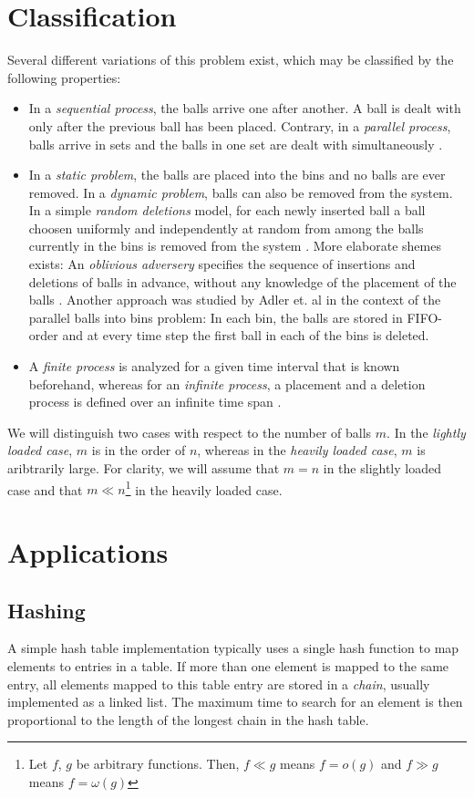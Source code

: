 \documentclass{acm_proc_article-sp}
\begin{document}
\section{Classification}
\label{sec:classification}
Several different variations of this problem exist, which may be classified by the following properties:
\begin{itemize}
\item In a \emph{sequential process}, the balls arrive one after another. A  ball is dealt with only after the previous ball has been placed. Contrary, in a \emph{parallel process}, balls arrive in sets and the balls in one set are dealt with simultaneously \cite{ABS98}. 
\item In a \emph{static problem}, the balls are placed into the bins and no balls are ever removed. In a \emph{dynamic problem}, balls can also be removed from the system. In a simple \emph{random deletions} model, for each newly inserted ball a ball choosen uniformly and independently at random from among the balls currently in the bins is removed from the system \cite{ABKU99} \cite{MRS01}. More elaborate shemes exists: An \emph{oblivious adversery} specifies the sequence of insertions and deletions of balls in advance, without any knowledge of the placement of the balls \cite{CFM+98}. Another approach was studied by Adler et. al \cite{ABS98} in the context of the parallel balls into bins problem: In each bin, the balls are stored in FIFO-order and at every time step the first ball in each of the bins is deleted. 
\item A \emph{finite process} is analyzed for a given time interval that is known beforehand, whereas for an \emph{infinite process}, a placement and a deletion process is defined over an infinite time span \cite{ABS98}.
\end{itemize}

We will distinguish two cases with respect to the number of balls $m$. In the \emph{lightly loaded case}, $m$ is in the order of $n$, whereas in the \emph{heavily loaded case}, $m$ is aribtrarily large. For clarity, we will assume that $m = n$ in the slightly loaded case and that $m \ll n$\footnote{Let $f$, $g$ be arbitrary functions. Then, $f \ll g$ means $f = o(g)$ and $ f \gg g$ means $f = \omega(g)$} in the heavily loaded case. 

\section{Applications}
\label{sec:applications}
\subsection{Hashing}
A simple hash table implementation typically uses a single hash function to map elements to entries in a table. If more than one element is mapped to the same entry, all elements mapped to this table entry are stored in a \emph{chain}, usually implemented as a linked list. The maximum time to search for an element is then proportional to the length of the longest chain in the hash table. 
\end{document}
